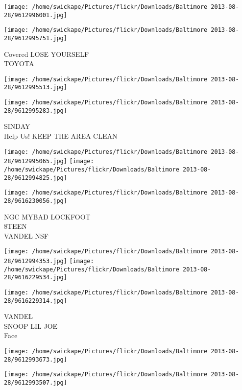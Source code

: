 \documentclass[10pt,letterpaper]{article}
\begin{document}
\texttt{[image: /home/swickape/Pictures/flickr/Downloads/Baltimore 2013-08-28/9612996001.jpg]}

\vspace{0.25in}
\texttt{[image: /home/swickape/Pictures/flickr/Downloads/Baltimore 2013-08-28/9612995751.jpg]}

Covered LOSE YOURSELF\\
TOYOTA
\pagebreak

\texttt{[image: /home/swickape/Pictures/flickr/Downloads/Baltimore 2013-08-28/9612995513.jpg]}

\vspace{0.25in}
\texttt{[image: /home/swickape/Pictures/flickr/Downloads/Baltimore 2013-08-28/9612995283.jpg]}

SINDAY\\
Help Us! KEEP THE AREA CLEAN
\pagebreak

\texttt{[image: /home/swickape/Pictures/flickr/Downloads/Baltimore 2013-08-28/9612995065.jpg]}
\texttt{[image: /home/swickape/Pictures/flickr/Downloads/Baltimore 2013-08-28/9612994825.jpg]}

\vspace{0.25in}
\texttt{[image: /home/swickape/Pictures/flickr/Downloads/Baltimore 2013-08-28/9616230056.jpg]}

NGC MYBAD LOCKFOOT\\
8TEEN\\
VANDEL NSF
\pagebreak

\texttt{[image: /home/swickape/Pictures/flickr/Downloads/Baltimore 2013-08-28/9612994353.jpg]}
\texttt{[image: /home/swickape/Pictures/flickr/Downloads/Baltimore 2013-08-28/9616229534.jpg]}

\vspace{0.25in}
\texttt{[image: /home/swickape/Pictures/flickr/Downloads/Baltimore 2013-08-28/9616229314.jpg]}

VANDEL\\
SNOOP LIL JOE\\
Face
\pagebreak

\texttt{[image: /home/swickape/Pictures/flickr/Downloads/Baltimore 2013-08-28/9612993673.jpg]}

\vspace{0.25in}
\texttt{[image: /home/swickape/Pictures/flickr/Downloads/Baltimore 2013-08-28/9612993507.jpg]}
\end{document}
